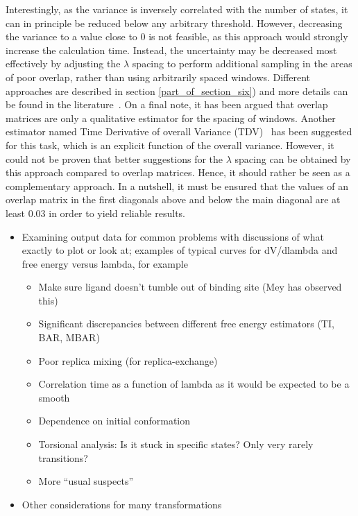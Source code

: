 \documentclass[9pt,bestpractices]{livecoms}
\begin{document}
Interestingly, as the variance is inversely correlated with the number of states\cite{klimovich2015guidelines}, it can in principle be reduced below any arbitrary threshold. However, decreasing the variance to a value close to 0 is not feasible, as this approach would strongly increase the calculation time. Instead, the uncertainty may be decreased most effectively by adjusting the $\lambda$ spacing to perform additional sampling in the areas of poor overlap, rather than using arbitrarily spaced windows. Different approaches are described in section \ref{part_of_section_six}) and more details can be found in the literature~\cite{dakka2018concurrent, hahn2019alchemical}.
On a final note, it has been argued that overlap matrices are only a qualitative estimator for the spacing of windows. Another estimator named Time Derivative of overall Variance (TDV)~\cite{sun2017barbased} has been suggested for this task, which is an explicit function of the overall variance. However, it could not be proven that better suggestions for the $\lambda$ spacing can be obtained by this approach compared to overlap matrices. Hence, it should rather be seen as a complementary approach. 
In a nutshell, it must be ensured that the values of an overlap matrix in the first diagonals above and below the main diagonal are at least 0.03 in order to yield reliable results. 

\begin{itemize}
\item Examining output data for common problems with discussions of what exactly to plot or look at; examples of typical curves for dV/dlambda and free energy versus lambda, for example
\begin{itemize}
\item Make sure ligand doesn’t tumble out of binding site (Mey has observed this)
\item Significant discrepancies between different free energy estimators (TI, BAR, MBAR)
\item Poor replica mixing (for replica-exchange)
\item Correlation time as a function of lambda as it would be expected to be a smooth
\item Dependence on initial conformation
\item Torsional analysis: Is it stuck in specific states? Only very rarely transitions?
\item More “usual suspects”
\end{itemize}
\item Other considerations for many transformations
\end{itemize}
\end{document}
